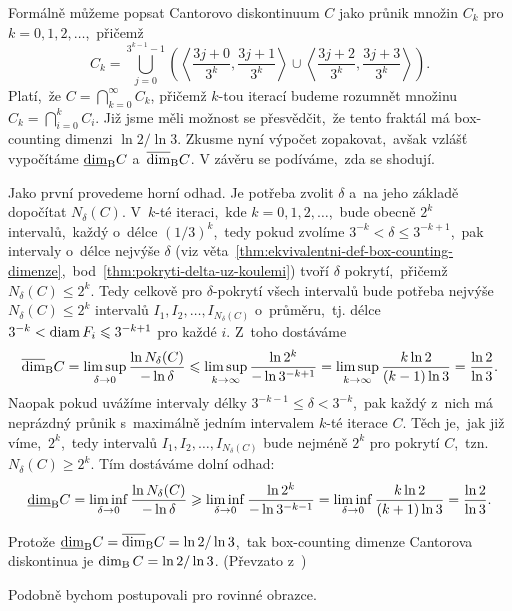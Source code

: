 \begin{example}\label{ex:cantorovo-diskontinuum}
    Formálně můžeme popsat Cantorovo diskontinuum $C$ jako průnik množin $C_k$ pro $k=0,1,2,\ldots$,~přičemž
    \[C_k=\bigcup _{j=0}^{3^{k-1}-1}\left(\left\langle{\frac {3j+0}{3^{k}}},{\frac {3j+1}{3^{k}}}\right\rangle\cup \left\langle{\frac {3j+2}{3^{k}}},{\frac {3j+3}{3^{k}}}\right\rangle\right).\]
    Platí,~že $C=\bigcap_{k=0}^\infty C_k$, přičemž $k$-tou iterací budeme rozumnět množinu $C_k=\bigcap_{i=0}^k C_i$. Již jsme měli možnost se přesvědčit,~že tento fraktál má box-counting dimenzi $\ln{2}/\ln{3}$. Zkusme nyní výpočet zopakovat,~avšak vzlášť vypočítáme $\underline{\dim}_\textup{B}{C}$ a~$\overline{\dim}_\textup{B}{C}$. V závěru se podíváme,~zda se shodují.

    Jako první provedeme horní odhad. Je potřeba zvolit $\delta$ a~na jeho základě dopočítat $N_\delta(C)$. V~$k$-té iteraci,~kde $k=0,1,2,\ldots$,~bude obecně $2^k$ intervalů,~každý o~délce $(1/3)^k$,~tedy pokud zvolíme $3^{-k}<\delta\leqslant 3^{-k+1}$,~pak intervaly o~délce nejvýše $\delta$ (viz věta~\ref{thm:ekvivalentni-def-box-counting-dimenze},~bod~\ref{thm:pokryti-delta-uz-koulemi}) tvoří $\delta$ pokrytí,~přičemž $N_\delta(C)\leqslant 2^k$. Tedy celkově pro $\delta$-pokrytí všech intervalů bude potřeba nejvýše $N_\delta(C)\leqslant 2^k$ intervalů $I_1,I_2,\ldots,I_{N_\delta(C)}$ o~průměru,~tj. délce $3^{-k}<\operatorname{diam}{F_i}\leqslant 3^{-k+1}$ pro každé $i$. Z~toho dostáváme
    \[\overline{\dim}_\textup{B}{C}=\limsup_{\delta\to 0}\dfrac{\ln{N_\delta(C)}}{-\ln{\delta}}\leqslant\limsup_{k\to\infty}\dfrac{\ln{2^k}}{-\ln{3^{-k+1}}}=\limsup_{k\to\infty}\dfrac{k\ln{2}}{(k-1)\ln{3}}=\dfrac{\ln{2}}{\ln{3}}.\]
    Naopak pokud uvážíme intervaly délky $3^{-k-1}\leqslant\delta<3^{-k}$,~pak každý z~nich má neprázdný průnik s~maximálně jedním intervalem $k$-té iterace $C$. Těch je,~jak již víme,~$2^k$,~tedy intervalů $I_1,I_2,\ldots,I_{N_\delta(C)}$ bude nejméně $2^k$ pro pokrytí $C$,~tzn. $N_\delta(C)\geqslant 2^k$. Tím dostáváme dolní odhad:
    \[\underline{\dim}_\textup{B}{C}=\liminf_{\delta\to 0}\dfrac{\ln{N_\delta(C)}}{-\ln{\delta}}\geqslant\liminf_{\delta\to 0}\dfrac{\ln{2^k}}{-\ln{3^{-k-1}}}=\liminf_{\delta\to 0}\dfrac{k\ln{2}}{(k+1)\ln{3}}=\dfrac{\ln{2}}{\ln{3}}.\]

    Protože $\underline{\dim}_\textup{B}{C}=\overline{\dim}_\textup{B}{C}=\ln{2}/\ln{3}$,~tak box-counting dimenze Cantorova diskontinua je $\operatorname{dim_B}{C}=\ln{2}/\ln{3}$. (Převzato z~\citep[str. 32]{Falconer2014})
\end{example}
Podobně bychom postupovali pro rovinné obrazce.

